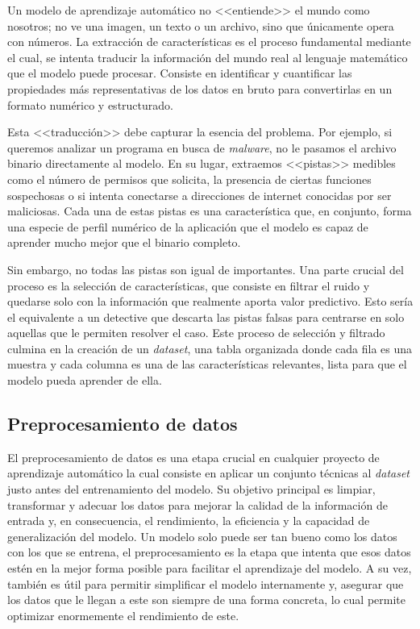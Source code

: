 Un modelo de aprendizaje automático no <<entiende>> el mundo como nosotros; no ve una imagen, un texto o un archivo, sino que únicamente opera con números. La extracción de características es el proceso fundamental mediante el cual, se intenta traducir la información del mundo real al lenguaje matemático que el modelo puede procesar. Consiste en identificar y cuantificar las propiedades más representativas de los datos en bruto para convertirlas en un formato numérico y estructurado.

Esta <<traducción>> debe capturar la esencia del problema. Por ejemplo, si queremos analizar un programa en busca de \textit{malware}, no le pasamos el archivo binario directamente al modelo. En su lugar, extraemos <<pistas>> medibles como el número de permisos que solicita, la presencia de ciertas funciones sospechosas o si intenta conectarse a direcciones de internet conocidas por ser maliciosas. Cada una de estas pistas es una característica que, en conjunto, forma una especie de perfil numérico de la aplicación que el modelo es capaz de aprender mucho mejor que el binario completo.


Sin embargo, no todas las pistas son igual de importantes. Una parte crucial del proceso es la selección de características, que consiste en filtrar el ruido y quedarse solo con la información que realmente aporta valor predictivo. Esto sería el equivalente a un detective que descarta las pistas falsas para centrarse en solo aquellas que le permiten resolver el caso. Este proceso de selección y filtrado culmina en la creación de un \textit{dataset}, una tabla organizada donde cada fila es una muestra y cada columna es una de las características relevantes, lista para que el modelo pueda aprender de ella.

\subsection{Preprocesamiento de datos}

El preprocesamiento de datos es una etapa crucial en cualquier proyecto de aprendizaje automático la cual consiste en aplicar un conjunto técnicas al \textit{dataset} justo antes del entrenamiento del modelo. Su objetivo principal es limpiar, transformar y adecuar los datos para mejorar la calidad de la información de entrada y, en consecuencia, el rendimiento, la eficiencia y la capacidad de generalización del modelo. Un modelo solo puede ser tan bueno como los datos con los que se entrena, el preprocesamiento es la etapa que intenta que esos datos estén en la mejor forma posible para facilitar el aprendizaje del modelo. A su vez, también es útil para permitir simplificar el modelo internamente y, asegurar que los datos que le llegan a este son siempre de una forma concreta, lo cual permite optimizar enormemente el rendimiento de este.

